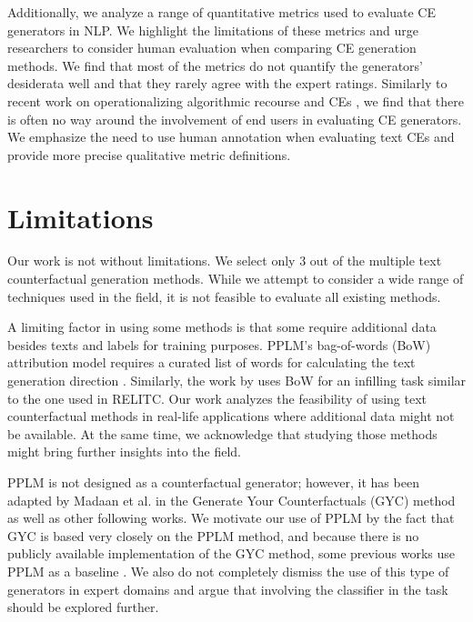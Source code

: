 \documentclass[11pt]{article}
\begin{document}
Additionally, we analyze a range of quantitative metrics used to evaluate CE generators in NLP. We highlight the limitations of these metrics and urge researchers to consider human evaluation when comparing CE generation methods. We find that most of the metrics do not quantify the generators' desiderata well and that they rarely agree with the expert ratings. Similarly to recent work on operationalizing algorithmic recourse and CEs \cite{buszydlik_grounding_2024}, we find that there is often no way around the involvement of end users in evaluating CE generators. We emphasize the need to use human annotation when evaluating text CEs and provide more precise qualitative metric definitions. 

\section*{Limitations}

Our work is not without limitations. We select only 3 out of the multiple text counterfactual generation methods. While we attempt to consider a wide range of techniques used in the field, it is not feasible to evaluate all existing methods. 

A limiting factor in using some methods is that some require additional data besides texts and labels for training purposes. PPLM's bag-of-words (BoW) attribution model requires a curated list of words for calculating the text generation direction \cite{dathathri_plug_2019}. Similarly, the work by \citet{yang_generating_2020} uses BoW for an infilling task similar to the one used in RELITC. Our work analyzes the feasibility of using text counterfactual methods in real-life applications where additional data might not be available. At the same time, we acknowledge that studying those methods might bring further insights into the field. 

PPLM is not designed as a counterfactual generator; however, it has been adapted by Madaan et al. in the Generate Your Counterfactuals (GYC) method \cite{madaan_generate_2021} as well as other following works. We motivate our use of PPLM by the fact that GYC is based very closely on the PPLM method, and because there is no publicly available implementation of the GYC method, some previous works use PPLM as a baseline \cite{longo_courge_2023, liu_multi-aspect_2024}. We also do not completely dismiss the use of this type of generators in expert domains and argue that involving the classifier in the task should be explored further. 
\end{document}
